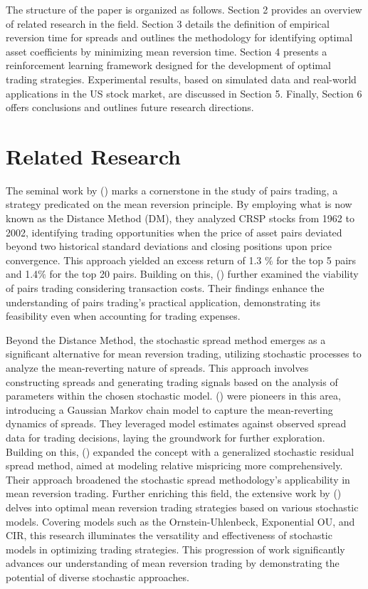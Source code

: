 \documentclass{article}
\begin{document}
The structure of the paper is organized as follows. Section 2 provides an overview of related research in the field. Section 3 details the definition of empirical reversion time for spreads and outlines the methodology for identifying optimal asset coefficients by minimizing mean reversion time. Section 4 presents a reinforcement learning framework designed for the development of optimal trading strategies. Experimental results, based on simulated data and real-world applications in the US stock market, are discussed in Section 5. Finally, Section 6 offers conclusions and outlines future research directions.

\section{Related Research} 
\label{sec2}
The seminal work by \citeauthor{gatev2006pairs} (\citeyear{gatev2006pairs}) marks a cornerstone in the study of pairs trading, a strategy predicated on the mean reversion principle. By employing what is now known as the Distance Method (DM), they analyzed CRSP stocks from 1962 to 2002, identifying trading opportunities when the price of asset pairs deviated beyond two historical standard deviations and closing positions upon price convergence. This approach yielded an excess return of 1.3 $\%$ for the top 5 pairs and 1.4$\%$ for the top 20 pairs. Building on this, \citeauthor{do2012pairs} (\citeyear{do2012pairs}) further examined the viability of pairs trading considering transaction costs. Their findings enhance the understanding of pairs trading's practical application, demonstrating its feasibility even when accounting for trading expenses.

Beyond the Distance Method, the stochastic spread method emerges as a significant alternative for mean reversion trading, utilizing stochastic processes to analyze the mean-reverting nature of spreads. This approach involves constructing spreads and generating trading signals based on the analysis of parameters within the chosen stochastic model. \citeauthor{elliott2005pairs} (\citeyear{elliott2005pairs}) were pioneers in this area, introducing a Gaussian Markov chain model to capture the mean-reverting dynamics of spreads. They leveraged model estimates against observed spread data for trading decisions, laying the groundwork for further exploration. Building on this, \citeauthor{do2006new} (\citeyear{do2006new}) expanded the concept with a generalized stochastic residual spread method, aimed at modeling relative mispricing more comprehensively. Their approach broadened the stochastic spread methodology's applicability in mean reversion trading. Further enriching this field, the extensive work by \citeauthor{meanReversionBook} (\citeyear{meanReversionBook}) delves into optimal mean reversion trading strategies based on various stochastic models. Covering models such as the Ornstein-Uhlenbeck, Exponential OU, and CIR, this research illuminates the versatility and effectiveness of stochastic models in optimizing trading strategies. This progression of work significantly advances our understanding of mean reversion trading by demonstrating the potential of diverse stochastic approaches.
\end{document}
